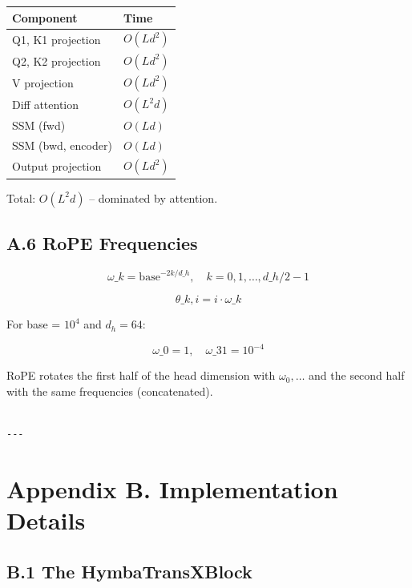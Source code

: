 \begin{table}[H]
\centering
\small
\begin{tabular}{ll}
\toprule
\textbf{Component} & \textbf{Time} \\
\midrule
Q1, K1 projection & $O(L d^2)$ \\
Q2, K2 projection & $O(L d^2)$ \\
V projection & $O(L d^2)$ \\
Diff attention & $O(L^2 d)$ \\
SSM (fwd) & $O(L d)$ \\
SSM (bwd, encoder) & $O(L d)$ \\
Output projection & $O(L d^2)$ \\
\bottomrule
\end{tabular}
\end{table}

Total: $O(L^2 d)$ -- dominated by attention.

\subsection{A.6 RoPE Frequencies}

\[
\omega\_k = \text{base}^{-2k/d\_h}, \quad k = 0, 1, \dots, d\_h/2 - 1
\tag{A.11}
\]

\[
\theta\_{k, i} = i \cdot \omega\_k
\tag{A.12}
\]

For base = $10^4$ and $d_h = 64$:

\[
\omega\_0 = 1, \quad \omega\_{31} = 10^{-4}
\tag{A.13}
\]

RoPE rotates the first half of the head dimension with $\omega_0, \dots$ and 
the second half with the same frequencies (concatenated).
\begin{lstlisting}

---
\end{lstlisting}

\section{Appendix B. Implementation Details}

\subsection{B.1 The HymbaTransXBlock}

